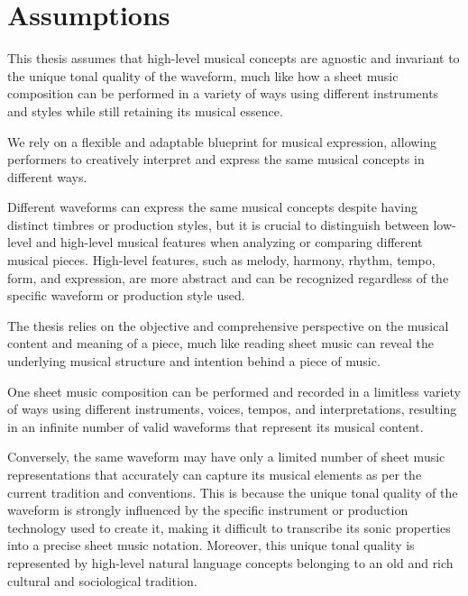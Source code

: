 \section{Assumptions}

This thesis assumes that high-level musical concepts are agnostic and invariant to the unique tonal quality of the waveform, much like how a sheet music composition can be performed in a variety of ways using different instruments and styles while still retaining its musical essence. 

We rely on a flexible and adaptable blueprint for musical expression, allowing performers to creatively interpret and express the same musical concepts in different ways. 

Different waveforms can express the same musical concepts despite having distinct timbres or production styles, but it is crucial to distinguish between low-level and high-level musical features when analyzing or comparing different musical pieces. High-level features, such as melody, harmony, rhythm, tempo, form, and expression, are more abstract and can be recognized regardless of the specific waveform or production style used. 

The thesis relies on the objective and comprehensive perspective on the musical content and meaning of a piece, much like reading sheet music can reveal the underlying musical structure and intention behind a piece of music. 

One sheet music composition can be performed and recorded in a limitless variety of ways using different instruments, voices, tempos, and interpretations, resulting in an infinite number of valid waveforms that represent its musical content.

Conversely, the same waveform may have only a limited number of sheet music representations that accurately can capture its musical elements as per the current tradition and conventions. This is because the unique tonal quality of the waveform is strongly influenced by the specific instrument or production technology used to create it, making it difficult to transcribe its sonic properties into a precise sheet music notation. Moreover, this unique tonal quality is represented by high-level natural language concepts belonging to an old and rich cultural and sociological tradition.

